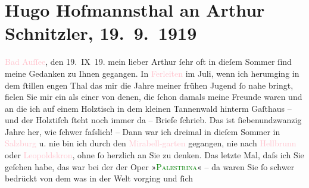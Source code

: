 

               \section[Hugo Hofmannsthal an Arthur Schnitzler, 19. 9. 1919]{ Hugo Hofmannsthal an Arthur Schnitzler, 19. 9. 1919}\nopagebreak{}\rehead{ }\normalsize\beginnumbering{} \toendnotes[C]{\smallbreak\pagebreak[2]} 
\toendnotes[C]{\smallbreak}\pstart
           {\pb}\textcolor{pink}{Bad Auſſee}{}\ledrightnote{\textcolor{pink}{Bad Aussee}}, den 19. IX 19.\pend
           \pstart{}mein lieber Arthur\pend\pstart
           ſehr oft in dieſem Sommer ſind meine Gedanken zu Ihnen gegangen. In \textcolor{pink}{Ferleiten}{}\ledrightnote{\textcolor{pink}{Ferleiten}} im Juli, wenn ich herumging in dem
               ſtillen engen Thal das mir die Jahre meiner frühen Jugend ſo nahe bringt, fielen Sie
               mir ein als einer von denen, die ſchon damals meine Freunde waren und an die ich auf
               einem Holztisch in dem kleinen Tannenwald hinterm Gaſthaus – und der Holztiſch ſteht
               noch immer da – Briefe ſchrieb. Das ist ſiebenundzwanzig Jahre her, wie ſchwer
               faſslich! – Dann war ich dreimal in dieſem Sommer in \textcolor{pink}{Salzburg}{}\ledrightnote{\textcolor{pink}{Salzburg}} u. nie bin ich durch den \textcolor{pink}{Mirabell-garten}{}\ledrightnote{\textcolor{pink}{Mirabell}} gegangen, nie nach \textcolor{pink}{Hellbrunn}{}\ledrightnote{\textcolor{pink}{Hellbrunn}}
               oder \textcolor{pink}{Leopoldskron}{}\ledrightnote{\textcolor{pink}{Salzburg-Leopoldskron}}, ohne ſo herzlich an Sie zu
               denken.\pend
           \pstart
           Das letzte Mal, daſs ich Sie geſehen habe, das war bei der \label{K_L02326_1v}\label{K_L02326_1h} der Oper »\textcolor{green}{\textsc{Palestrina}}{}\ledrightnote{\textcolor{green}{Palestrina. Musikalische Legende in drei Akten}}« – da waren Sie ſo schwer bedrückt von dem was in der Welt vorging und ſich
